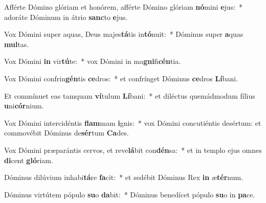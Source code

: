 \item Afférte Dómino glóriam et honórem, afférte Dómino glóriam \textbf{nó}mini \textbf{e}jus:~* adoráte Dóminum in átrio \textbf{sanc}to \textbf{e}jus.
\item Vox Dómini super aquas, Deus majes\textbf{tá}tis in\textbf{tó}nuit:~* Dóminus super \textbf{a}quas \textbf{mul}tas.
\item Vox Dómini \textbf{in} vir\textbf{tú}te:~* vox Dómini in ma\textbf{gni}fi\textbf{cén}tia.
\item Vox Dómini confrin\textbf{gén}tis \textbf{ce}dros:~* et confrínget Dóminus \textbf{ce}dros \textbf{Lí}bani.
\item Et commínuet eas tamquam \textbf{ví}tulum \textbf{Lí}bani:~* et diléctus quemádmodum fílius \textbf{u}ni\textbf{cór}nium.
\item Vox Dómini intercidéntis \textbf{flam}mam \textbf{i}gnis:~* vox Dómini concutiéntis desértum: et commovébit Dóminus de\textbf{sér}tum \textbf{Ca}des.
\item Vox Dómini præparántis cervos, et reve\textbf{lá}bit con\textbf{dén}sa:~* et in templo ejus omnes \textbf{di}cent \textbf{gló}riam.
\item Dóminus dilúvium inhabi\textbf{tá}re \textbf{fa}cit:~* et sedébit Dóminus Rex \textbf{in} æ\textbf{tér}num.
\item Dóminus virtútem pópulo \textbf{su}o \textbf{da}bit:~* Dóminus benedícet pópulo \textbf{su}o in \textbf{pa}ce.
